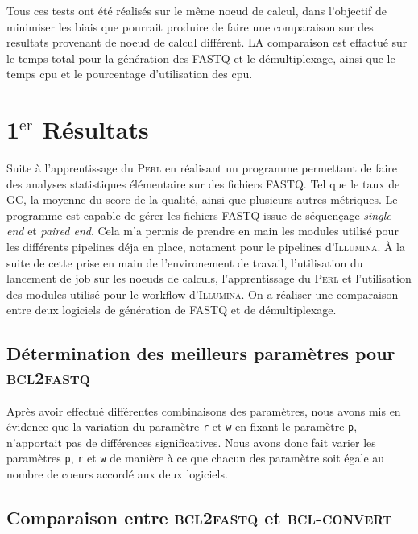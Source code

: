 Tous ces tests ont été  réalisés sur le même noeud de calcul, dans l'objectif de minimiser les biais que pourrait produire de faire une comparaison sur des resultats provenant de noeud de calcul différent. LA comparaison est effactué sur le temps total pour la génération des \textsc{FASTQ} et le démultiplexage, ainsi que le temps cpu et le pourcentage d'utilisation des cpu.

\section{1$^{\text{er}}$ Résultats}
Suite à l'apprentissage du \textsc{Perl} en réalisant un programme permettant de faire des analyses statistiques élémentaire sur des fichiers \textsc{FASTQ}. Tel que le taux de GC, la moyenne du score de la qualité, ainsi que plusieurs autres métriques. Le programme est capable de gérer les fichiers \textsc{FASTQ} issue de séquençage \emph{single end} et \emph{paired end}. Cela m'a permis de prendre en main les modules utilisé pour les différents pipelines déja en place, notament pour  le pipelines d'\textsc{Illumina}. À la suite de cette prise en main de l'environement de travail, l'utilisation du lancement de job sur les noeuds de calculs, l'apprentissage du \textsc{Perl} et l'utilisation des modules utilisé pour le workflow d'\textsc{Illumina}. On a réaliser une comparaison entre deux logiciels de génération de \textsc{FASTQ} et de démultiplexage.

\subsection{Détermination des meilleurs paramètres pour \textsc{bcl2fastq}}
Après avoir effectué différentes combinaisons des paramètres, nous avons mis en évidence que la variation du paramètre \texttt{r} et \texttt{w} en fixant le paramètre \texttt{p}, n'apportait pas de différences significatives. Nous avons donc fait varier les paramètres \texttt{p}, \texttt{r} et \texttt{w} de manière à ce que chacun des paramètre soit égale au nombre de coeurs accordé aux deux logiciels.

\subsection{Comparaison entre \textsc{bcl2fastq} et \textsc{bcl-convert}}

